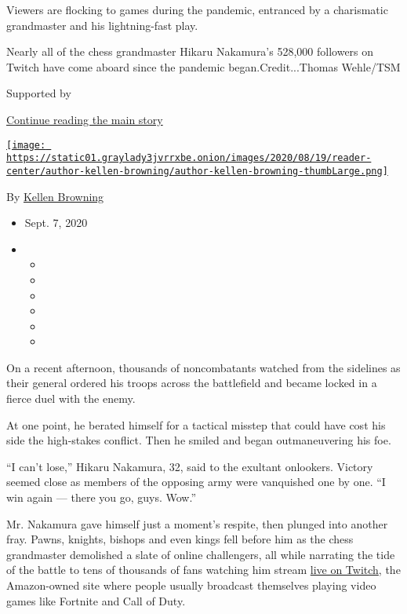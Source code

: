 Viewers are flocking to games during the pandemic, entranced by a
charismatic grandmaster and his lightning-fast play.

Nearly all of the chess grandmaster Hikaru Nakamura's 528,000 followers
on Twitch have come aboard since the pandemic began.Credit...Thomas
Wehle/TSM

Supported by

\protect\hyperlink{after-sponsor}{Continue reading the main story}

\href{https://www.nytimes3xbfgragh.onion/by/kellen-browning}{\texttt{[image: https://static01.graylady3jvrrxbe.onion/images/2020/08/19/reader-center/author-kellen-browning/author-kellen-browning-thumbLarge.png]}}

By \href{https://www.nytimes3xbfgragh.onion/by/kellen-browning}{Kellen
Browning}

\begin{itemize}
\item
  Sept. 7, 2020
\item
  \begin{itemize}
  \item
  \item
  \item
  \item
  \item
  \item
  \end{itemize}
\end{itemize}

On a recent afternoon, thousands of noncombatants watched from the
sidelines as their general ordered his troops across the battlefield and
became locked in a fierce duel with the enemy.

At one point, he berated himself for a tactical misstep that could have
cost his side the high-stakes conflict. Then he smiled and began
outmaneuvering his foe.

``I can't lose,'' Hikaru Nakamura, 32, said to the exultant onlookers.
Victory seemed close as members of the opposing army were vanquished one
by one. ``I win again --- there you go, guys. Wow.''

Mr. Nakamura gave himself just a moment's respite, then plunged into
another fray. Pawns, knights, bishops and even kings fell before him as
the chess grandmaster demolished a slate of online challengers, all
while narrating the tide of the battle to tens of thousands of fans
watching him stream
\href{https://www.nytimes3xbfgragh.onion/2014/08/26/technology/amazon-nears-a-deal-for-twitch.html}{live
on Twitch}, the Amazon-owned site where people usually broadcast
themselves playing video games like Fortnite and Call of Duty.

